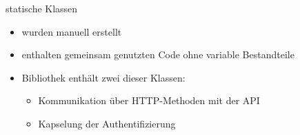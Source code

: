 \begin{frame}{statische Klassen}
    \begin{itemize}
        \item wurden manuell erstellt
        \item enthalten gemeinsam genutzten Code ohne variable Bestandteile
        \item Bibliothek enthält zwei dieser Klassen:
        \begin{itemize}
            \item Kommunikation über HTTP-Methoden mit der API
            \item Kapselung der Authentifizierung
        \end{itemize}
    \end{itemize}
\end{frame}